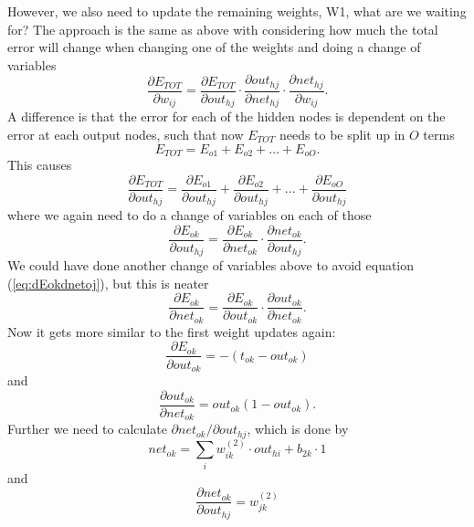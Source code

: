 \documentclass[norsk,a4paper,12pt]{article}
\begin{document}
However, we also need to update the remaining weights, W1, what are we waiting for? The approach is the same as above with considering how much the total error will change when changing one of the weights and doing a change of variables
\begin{equation}
\frac{\partial E_{TOT}}{\partial w_{ij}}=\frac{\partial E_{TOT}}{\partial out_{hj}}\cdot\frac{\partial out_{hj}}{\partial net_{hj}}\cdot\frac{\partial net_{hj}}{\partial w_{ij}}.
\end{equation}
A difference is that the error for each of the hidden nodes is dependent on the error at each output nodes, such that now $E_{TOT}$ needs to be split up in $O$ terms
\begin{equation}
E_{TOT}=E_{o1} + E_{o2} + \hdots + E_{oO}.
\end{equation}
This causes
\begin{equation}
\frac{\partial E_{TOT}}{\partial out_{hj}}=\frac{\partial E_{o1}}{\partial out_{hj}} + \frac{\partial E_{o2}}{\partial out_{hj}} + \hdots + \frac{\partial E_{oO}}{\partial out_{hj}}
\end{equation}
where we again need to do a change of variables on each of those
\begin{equation}
\frac{\partial E_{ok}}{\partial out_{hj}}=\frac{\partial E_{ok}}{\partial net_{ok}}\cdot\frac{\partial net_{ok}}{\partial out_{hj}}.
\end{equation}
We could have done another change of variables above to avoid equation (\ref{eq:dEokdnetoj}), but this is neater
\begin{equation}
\frac{\partial E_{ok}}{\partial net_{ok}}=\frac{\partial E_{ok}}{\partial out_{ok}}\cdot \frac{\partial out_{ok}}{\partial net_{ok}}.
\label{eq:dEokdnetoj}
\end{equation}
Now it gets more similar to the first weight updates again:
\begin{equation}
\frac{\partial E_{ok}}{\partial out_{ok}}=-(t_{ok}-out_{ok})
\end{equation}
and
\begin{equation}
\frac{\partial out_{ok}}{\partial net_{ok}} = out_{ok}(1-out_{ok}).
\end{equation}
Further we need to calculate $\partial net_{ok}/\partial out_{hj}$, which is done by
\begin{equation}
net_{ok} = \sum_i w_{ik}^{(2)}\cdot out_{hi} + b_{2k}\cdot 1
\end{equation}
and
\begin{equation}
\frac{\partial net_{ok}}{\partial out_{hj}}=w_{jk}^{(2)}
\end{equation}
\end{document}
